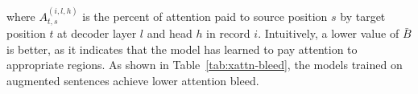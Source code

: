 \noindent where $A^{(i,l,h)}_{t,s}$ is the percent of attention paid to source position $s$ by target position $t$ at decoder layer $l$ and head $h$ in record $i$. Intuitively, a lower value of $\bar{B}$ is better, as it indicates that the model has learned to pay attention to appropriate regions. 
 As shown in Table~\ref{tab:xattn-bleed}, the models trained on augmented sentences achieve lower attention bleed. 

